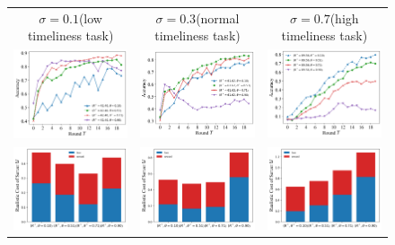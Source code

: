 \documentclass{article}
\theoremstyle{plain}
\theoremstyle{definition}
\theoremstyle{remark}
\begin{document}
\begin{figure}[htbp] %
    \centering
    \begin{tabular}{ccc} %
        \multicolumn{1}{c}{$\sigma=0.1$(low timeliness task)} &
        \multicolumn{1}{c}{$\sigma=0.3$(normal timeliness task)} &
        \multicolumn{1}{c}{$\sigma=0.7$(high timeliness task)} \\ %
        
        \includegraphics[width=0.3\linewidth]{figures/figure_65_A.png} &
        \includegraphics[width=0.3\linewidth]{figures/figure_65_B.png} &
        \includegraphics[width=0.3\linewidth]{figures/figure_65_C.png} \\ %
        
        \includegraphics[width=0.3\linewidth]{figures/figure_66_A.png} &
        \includegraphics[width=0.3\linewidth]{figures/figure_66_B.png} &
        \includegraphics[width=0.3\linewidth]{figures/figure_66_C.png} \\ %
        

\end{tabular}
\end{figure}
\end{document}
